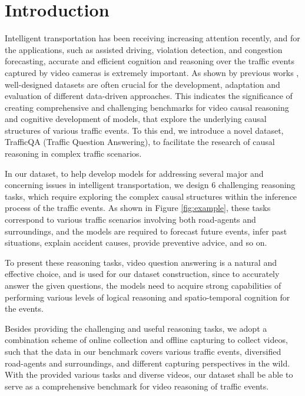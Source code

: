 \documentclass[final]{cvpr}
\begin{document}
\section{Introduction}

Intelligent transportation \cite{5959985} has been receiving increasing attention recently, and for the applications, such as assisted driving, violation detection, and congestion forecasting, accurate and efficient cognition and reasoning over the traffic events captured by video cameras is extremely important. As shown by previous works \cite{10.3115/1073012.1073017,35179}, well-designed datasets are often crucial for the development, adaptation and evaluation of different data-driven approaches. 
This indicates the significance of creating comprehensive and challenging benchmarks for video causal reasoning
and cognitive development of models, 
that explore the underlying causal structures of various traffic events. To this end, we introduce a novel dataset, TrafficQA (Traffic Question Answering), to facilitate the research of causal reasoning in complex traffic scenarios.

In our dataset, to help develop models for addressing several major and concerning issues in intelligent transportation, we design 6 challenging reasoning tasks, which require exploring the complex causal structures within the inference process of the traffic events. As shown in Figure \ref{fig:example},
these tasks correspond to various traffic scenarios involving both road-agents and surroundings, and the models are required to forecast future events, infer past situations, explain accident causes, provide preventive advice, and so on. 

To present these reasoning tasks, video question answering \cite{zhu2017uncovering} is a natural and effective choice, and is used for our dataset construction, since to accurately answer the given questions, the models need to acquire strong capabilities of performing various levels of logical reasoning and spatio-temporal cognition for the events.

Besides providing the challenging and useful reasoning tasks, 
we adopt a combination scheme of online collection and offline capturing to collect videos, such that the data in our benchmark covers various traffic events, diversified road-agents and surroundings, and different capturing perspectives in the wild. With the provided various tasks and diverse videos, our dataset shall be able to serve as a comprehensive benchmark for video reasoning of traffic events.
\end{document}
